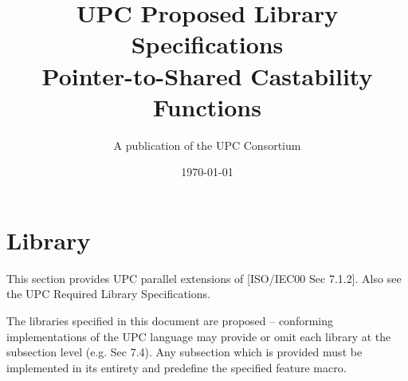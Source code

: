 \newcommand{\myspecversion}{Version 1.3}
\newcommand{\mydraftversion}{Draft 1}
\newcommand{\myversion}{\specversion}
\newcommand{\mytitle}{UPC Proposed Library Specifications\\
                      Pointer-to-Shared Castability Functions}


\makeindex

\title{\mytitle\\
\myversion}

\author{A publication of the UPC Consortium}

\date{\today}



\maketitle

\setcounter{page}{2}
\dotoc

\setcounter{section}{6} %
\section{Library}

\npf This section provides UPC parallel extensions of [ISO/IEC00 Sec 7.1.2]. Also see the UPC Required Library Specifications.

\np The libraries specified in this document are proposed --
conforming implementations of the UPC language may provide or 
omit each library at the subsection level (e.g. Sec 7.4). 
Any subsection which is provided must be implemented in its
entirety and predefine the specified feature macro.

\setcounter{subsection}{3} %


\doindex

